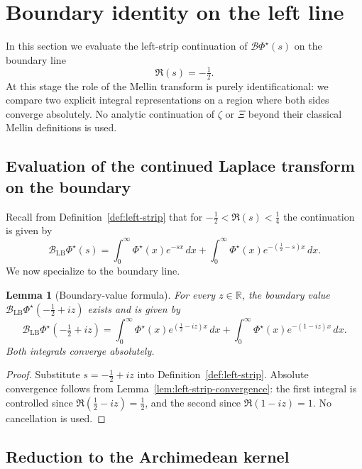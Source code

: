 \documentclass[11pt]{amsart}
\newtheorem{lemma}[theorem]{Lemma}
\theoremstyle{definition}
\theoremstyle{remark}
\newcommand{\R}{\mathbb{R}}
\begin{document}
\section{Boundary identity on the left line}
\label{sec:lb-identity}

In this section we evaluate the left-strip continuation of
$\mathcal B\Phi^{\star}(s)$ on the boundary line
\[
\Re(s)=-\tfrac12.
\]
At this stage the role of the Mellin transform is purely identificational:
we compare two explicit integral representations on a region where both
sides converge absolutely. No analytic continuation of $\zeta$ or $\Xi$
beyond their classical Mellin definitions is used.

\subsection{Evaluation of the continued Laplace transform on the boundary}

Recall from Definition~\ref{def:left-strip} that for
$-\tfrac12<\Re(s)<\tfrac14$ the continuation is given by
\[
\mathcal B_{\mathrm{LB}}\Phi^{\star}(s)
=
\int_{0}^{\infty}\Phi^{\star}(x)e^{-sx}\,dx
+
\int_{0}^{\infty}\Phi^{\star}(x)e^{-(\frac12-s)x}\,dx.
\]
We now specialize to the boundary line.

\begin{lemma}[Boundary-value formula]
\label{lem:boundary-formula}
For every $z\in\R$, the boundary value
$\mathcal B_{\mathrm{LB}}\Phi^{\star}(-\tfrac12+iz)$ exists and is given by
\begin{equation}
\label{eq:boundary-formula}
\mathcal B_{\mathrm{LB}}\Phi^{\star}\!\left(-\tfrac12+iz\right)
=
\int_{0}^{\infty}\Phi^{\star}(x)e^{(\frac12-iz)x}\,dx
+
\int_{0}^{\infty}\Phi^{\star}(x)e^{-(1-iz)x}\,dx.
\end{equation}
Both integrals converge absolutely.
\end{lemma}

\begin{proof}
Substitute $s=-\tfrac12+iz$ into Definition~\ref{def:left-strip}. Absolute
convergence follows from Lemma~\ref{lem:left-strip-convergence}: the first
integral is controlled since $\Re(\tfrac12-iz)=\tfrac12$, and the second since
$\Re(1-iz)=1$. No cancellation is used.
\end{proof}

\subsection{Reduction to the Archimedean kernel}
\end{document}
